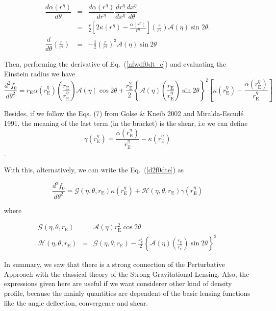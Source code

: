 \documentclass[a4paper,twoside,prd]{revtex4}
\def \ma {\mathcal{A}}
\def \re {r_{\mathrm{E}}}
\def \al {\alpha}
\def \te {\theta}
\def \xe {x^\eta}
\def \ree {r^\eta_{\mathrm{E}}}
\begin{document}
\begin{eqnarray}
\dfrac{d\al(r^\eta)}{d\te}&=&\dfrac{d\al(r^\eta)}{dr^\eta}\dfrac{dr^\eta}{d\xe}\dfrac{d\xe}{d\te} \nonumber \\
                          &=&\frac{r}{2}\left[ 2\kappa(r^\eta)-\frac{\al(r^\eta)}{r^\eta}\right]\left( \frac{r}{r^\eta} \right)\ma(\eta)\sin{2\te}.\\
\dfrac{d}{d\te}\left( \frac{r}{r^\eta} \right)&=&-\frac{1}{2}\left( \frac{r}{r^\eta} \right)^3\ma(\eta)\sin{2\te}
\end{eqnarray}

Then, performing the derivative of Eq.~(\ref{nfwdf0dt_c}) and evaluating the Einstein radius we have
\begin{equation}
\dfrac{d^2 f_0}{d\te^2}=\re\al(\ree)\left( \frac{\re}{\ree} \right)\ma(\eta)\cos{2\te}+%
\frac{\re^2}{2}\left\{\ma(\eta)\left(\frac{\re}{\ree}\right) \sin{2\te}  \right\}^2\left[\kappa(\ree)-\dfrac{\al(\ree)}{\ree}\right]
\label{d2f0dte}
\end{equation}


Besides, if we follow the Eqs. (7) from Golse \& Kneib 2002 and Miralda-Escud\'e 1991, the meaning of the last term (in the bracket) is the shear, 
i.e we can define
\begin{equation}\gamma(\ree)=\dfrac{\al(\ree)}{\ree}-\kappa(\ree)\end{equation}.

With this, alternatively, we can write the Eq.~(\ref{d2f0dte}) as

\begin{equation}
\dfrac{d^2 f_0}{d\te^2}=\mathcal{G}(\eta,\te,\re)\kappa(\ree)+\mathcal{H}(\eta,\te,\re)\gamma(\ree)
\end{equation}

where

\begin{eqnarray}
\mathcal{G}(\eta,\te,\re)&=& \ma(\eta)\re^2\cos{2\te}\\
\mathcal{H}(\eta,\te,\re)&=& \mathcal{G}(\eta,\te,\re)-\frac{\re^2}{2}\left\{\ma(\eta)\left(\frac{\re}{\ree}\right) \sin{2\te}  \right\}^2
\end{eqnarray}

In summary, we saw that there is a strong connection of the Perturbative Approach with the classical theory of the Strong Gravitational Lensing. Also,
the expressions given here are useful if we want considerer other kind of density profile, because the mainly quantities are dependent of the basic lensing functions like the angle deflection, convergence and shear.
\end{document}
